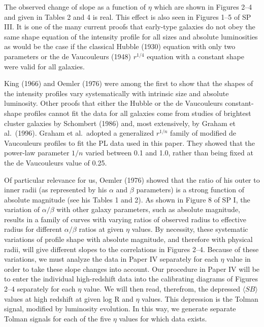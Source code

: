 \documentclass[preprint]{aastex}
\begin{document}
The observed change of slope as a function of $\eta$ which are shown
in Figures 2--4 and given in Tables 2 and 4 is real. This effect is
also seen in Figures 1--5 of SP III. It is one of the many current
proofs that early-type galaxies do not obey the same shape equation of
the intensity profile for all sizes and absolute luminosities as would
be the case if the classical Hubble (1930) equation with only two
parameters or the de Vaucouleurs (1948) $r^{1/4}$ equation with a
constant shape were valid for all galaxies.

King (1966) and Oemler (1976) were among the first to show that the
shapes of the intensity profiles vary systematically with intrinsic
size and absolute luminosity. Other proofs that either the Hubble or
the de Vaucouleurs constant-shape profiles cannot fit the data for all
galaxies come from studies of brightest cluster galaxies by Schombert
(1986) and, most extensively, by Graham et al.\ (1996).  Graham et
al.\ adopted a generalized $r^{1/n}$ family of modified de Vaucouleurs
profiles to fit the PL data used in this paper.  They showed that the
power-law parameter $1/n$ varied between 0.1 and 1.0, rather than
being fixed at the de Vaucouleurs value of 0.25.

Of particular relevance for us, Oemler (1976) showed that the ratio of
his outer to inner radii (as represented by his $\alpha$ and $\beta$
parameters) is a strong function of absolute magnitude (see his Tables
1 and 2).  As shown in Figure 8 of SP I, the variation of
$\alpha/\beta$ with other galaxy parameters, such as absolute
magnitude, results in a family of curves with varying ratios of
observed radius to effective radius for different $\alpha/\beta$
ratios at given $\eta$ values. By necessity, these systematic
variations of profile shape with absolute magnitude, and therefore
with physical radii, will give different slopes to the correlations in
Figures 2--4. Because of these variations, we must analyze the data in
Paper IV separately for each $\eta$ value in order to take these slope
changes into account. Our procedure in Paper IV will be to enter the
individual high-redshift data into the calibrating diagrams of Figures
2--4 separately for each $\eta$ value. We will then read, therefrom,
the depressed $\langle SB \rangle$ values at high redshift at given
log R and $\eta$ values. This depression is the Tolman signal,
modified by luminosity evolution. In this way, we generate separate
Tolman signals for each of the five $\eta$ values for which data
exists.
              
\end{document}
